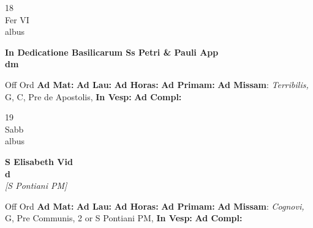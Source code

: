 \documentclass[10pt, openany]{book}
\begin{document}
    \begin{center}
        \begin{minipage}{3.5in}
            \vspace{2em}
            \begin{minipage}{0.5in}
                {\Huge 18} \\
                {\normalsize Fer VI} \\
                {\normalsize albus}
            \end{minipage}
            \begin{minipage}{3.0in}
                \textbf{ \large In Dedicatione Basilicarum Ss Petri \& Pauli App \\
                \textnormal{\normalsize dm}} \\ 
            \end{minipage}
            \begin{justify}Off Ord
                \textbf{Ad Mat: }
                \textbf{Ad Lau: }
                \textbf{Ad Horas: }
                \textbf{Ad Primam: }\textbf{Ad Missam}: \textit{Terribilis,} G, C, Pre de Apostolis,  
                \textbf{In Vesp: }
                \textbf{Ad Compl: }
            \end{justify}
        \end{minipage}
    \end{center}

    \begin{center}
        \begin{minipage}{3.5in}
            \vspace{2em}
            \begin{minipage}{0.5in}
                {\Huge 19} \\
                {\normalsize Sabb} \\
                {\normalsize albus}
            \end{minipage}
            \begin{minipage}{3.0in}
                \textbf{ \large S Elisabeth Vid \\
                \textnormal{\normalsize d}} \\ \textit{[S Pontiani PM]} \\ 
            \end{minipage}
            \begin{justify}Off Ord
                \textbf{Ad Mat: }
                \textbf{Ad Lau: }
                \textbf{Ad Horas: }
                \textbf{Ad Primam: }\textbf{Ad Missam}: \textit{Cognovi,} G, Pre Communis, 2 or S Pontiani PM,  
                \textbf{In Vesp: }
                \textbf{Ad Compl: }
            \end{justify}
        \end{minipage}
    \end{center}
\end{document}
